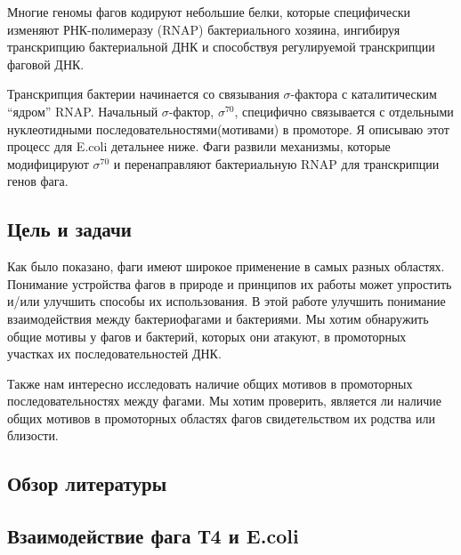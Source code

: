 \documentclass[14pt]{extarticle}
\begin{document}
    \par{Многие геномы фагов кодируют небольшие белки, которые специфически изменяют РНК-полимеразу (RNAP)
    бактериального хозяина, ингибируя транскрипцию бактериальной ДНК и способствуя регулируемой транскрипции фаговой 
    ДНК.}    
    
    \par{Транскрипция бактерии начинается со связывания $\sigma$-фактора с каталитическим ``ядром'' RNAP. Начальный 
    $\sigma$-фактор, $\sigma^{70}$, специфично связывается с отдельными нуклеотидными последовательностями(мотивами) в 
    промоторе. Я описываю этот процесс для E.coli детальнее ниже. Фаги развили механизмы, которые модифицируют 
    $\sigma^{70}$ и перенаправляют бактериальную RNAP для транскрипции генов фага.}
    
\newpage
\begin{center}
\item \section{Цель и задачи} \label{sec:code}
\end{center}

    \par{Как было показано, фаги имеют широкое применение в самых разных областях. Понимание устройства фагов в природе 
    и принципов их работы может упростить и/или улучшить способы их использования. В этой работе улучшить понимание 
    взаимодействия между бактериофагами и бактериями. Мы хотим обнаружить общие мотивы 
    у фагов и бактерий, которых они атакуют, в промоторных участках их последовательностей ДНК.}
    
    \par{Также нам интересно исследовать наличие общих мотивов в промоторных последовательностях между фагами. Мы хотим 
    проверить, является ли наличие общих мотивов в промоторных областях фагов свидетельством их родства или близости.}

\newpage
\begin{center}
\item \section{Обзор литературы} \label{sec:math}
\item \subsection{Взаимодействие фага Т4 и E.coli}
\end{center}
        
\end{document}
